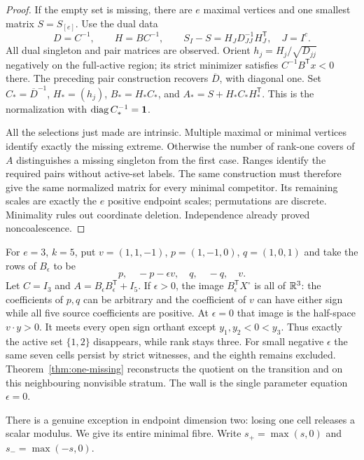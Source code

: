 \begin{proof}
If the empty set is missing, there are $e$ maximal vertices and one smallest
matrix $S=S_{[e]}$. Use the dual data
\[
 D=C^{-1},\qquad H=BC^{-1},\qquad
 S_I-S=H_JD_{JJ}^{-1}H_J^{\mathsf T},\quad J=I^c.
\]
All dual singleton and pair matrices are observed. Orient
$h_j=H_j/\sqrt{D_{jj}}$ negatively on the full-active region; its strict
minimizer satisfies $C^{-1}B^{\mathsf T}x<0$ there. The preceding pair
construction recovers $\overline D$, with diagonal one. Set
$C_*=\overline D^{-1}$, $H_*=(h_j)$,
$B_*=H_*C_*$, and $A_*=S+H_*C_*H_*^{\mathsf T}$.
This is the normalization with $\operatorname{diag} C_*^{-1}=\mathbf1$.

All the selections just made are intrinsic. Multiple maximal or minimal
vertices identify exactly the missing extreme. Otherwise the number of
rank-one covers of $A$ distinguishes a missing singleton from the first
case. Ranges identify the required pairs without active-set labels.
The same construction must therefore give the same normalized matrix for
every minimal competitor. Its remaining scales are exactly the $e$
positive endpoint scales; permutations are discrete. Minimality rules out
coordinate deletion. Independence already proved noncoalescence.
\end{proof}

\begin{example}\label{ex:seven-cells}
For $e=3$, $k=5$, put $v=(1,1,-1)$, $p=(1,-1,0)$, $q=(1,0,1)$ and take
the rows of $B_\epsilon$ to be
\[
 p,\quad -p-\epsilon v,\quad q,\quad -q,\quad v.
\]
Let $C=I_3$ and $A=B_\epsilon B_\epsilon^{\mathsf T}+I_5$. If
$\epsilon>0$, the image $B_\epsilon^{\mathsf T}X^\circ$ is all of
$\mathbb R^3$: the coefficients of $p,q$ can be arbitrary and the coefficient
of $v$ can have either sign while all five source coefficients are positive.
At $\epsilon=0$ that image is the half-space $v\cdot y>0$.
It meets every open sign orthant except $y_1,y_2<0<y_3$.
Thus exactly the active set $\{1,2\}$ disappears, while rank stays three.
For small negative $\epsilon$ the same seven cells persist by strict
witnesses, and the eighth remains excluded. Theorem~\ref{thm:one-missing}
reconstructs the quotient on the transition and on this neighbouring
nonvisible stratum. The wall is the single parameter equation $\epsilon=0$.
\end{example}

There is a genuine exception in endpoint dimension two: losing one cell
releases a scalar modulus. We give its entire minimal fibre. Write
$s_+=\max(s,0)$ and $s_-=\max(-s,0)$.

